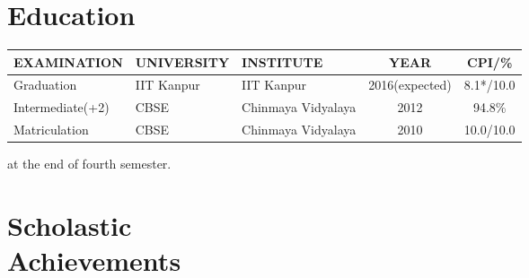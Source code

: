 \documentclass[margin,10pt]{resume}
\renewcommand{\baselinestretch}{1.2}
\begin{document}
\begin{resume}

\section{\mysidestyle Education}
\vspace{2mm}


\begin{table}[h]
\renewcommand{\arraystretch}{1.5}
\vspace{5mm}
\begin{tabularx}{\textwidth}{X X l c c}
\hline

EXAMINATION      & UNIVERSITY & INSTITUTE          & YEAR           & CPI/\%    \\ \hline

Graduation       & IIT Kanpur & IIT Kanpur         & 2016(expected) & 8.1*/10.0 \\ \hline

Intermediate(+2) & CBSE       & Chinmaya Vidyalaya & 2012           & 94.8\%    \\ \hline

Matriculation    & CBSE       & Chinmaya Vidyalaya & 2010           & 10.0/10.0    \\ \hline

\end{tabularx}

{\vspace{2mm}\small * at the end of fourth semester.}
\end{table}

\vspace{-2mm}
\section{\mysidestyle Scholastic\\Achievements}

\begin{list2}
\begin{spacing}{1.4}
\renewcommand{\baselinestretch}{1.3}


\end{spacing}
\end{list2}
\end{resume}
\end{document}
